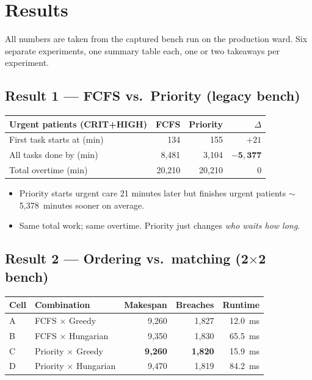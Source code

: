 \section{Results}
\label{sec:results}

All numbers are taken from the captured bench run on the
production ward. Six separate experiments, one summary table each,
one or two takeaways per experiment.

\subsection{Result 1 --- FCFS vs.\ Priority (legacy bench)}

\begin{table}[H]
\centering
\small
\begin{tabular}{l r r r}
\toprule
\textbf{Urgent patients (CRIT+HIGH)} & \textbf{FCFS} & \textbf{Priority} & \textbf{$\Delta$} \\
\midrule
First task starts at (min)   &   134 &   155 & $+21$ \\
All tasks done by (min)      & 8{,}481 & 3{,}104 & $\bm{-5{,}377}$ \\
Total overtime (min)         & 20{,}210 & 20{,}210 & 0 \\
\bottomrule
\end{tabular}
\end{table}

\begin{itemize}
  \item Priority starts urgent care 21 minutes later but finishes
        urgent patients $\sim$5{,}378~minutes sooner on average.
  \item Same total work; same overtime. Priority just changes
        \emph{who waits how long}.
\end{itemize}

\subsection{Result 2 --- Ordering vs.\ matching (2$\times$2 bench)}

\begin{table}[H]
\centering
\small
\begin{tabular}{l l r r r}
\toprule
\textbf{Cell} & \textbf{Combination} & \textbf{Makespan} &
\textbf{Breaches} & \textbf{Runtime} \\
\midrule
A & FCFS $\times$ Greedy        & 9{,}260 & 1{,}827 & 12.0~ms \\
B & FCFS $\times$ Hungarian     & 9{,}350 & 1{,}830 & 65.5~ms \\
C & Priority $\times$ Greedy    & \textbf{9{,}260} & \textbf{1{,}820} & 15.9~ms \\
D & Priority $\times$ Hungarian & 9{,}470 & 1{,}819 & 84.2~ms \\
\bottomrule
\end{tabular}
\end{table}

